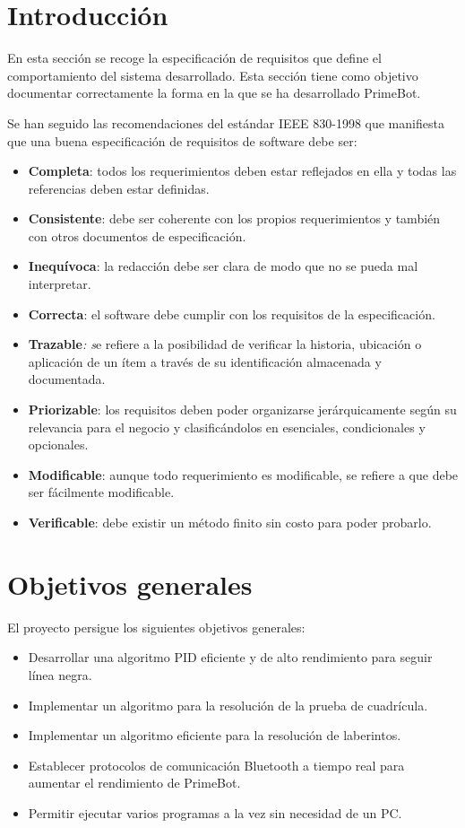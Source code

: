 
\section{Introducción}

En esta sección se recoge la especificación de requisitos que define el comportamiento del sistema desarrollado.
Esta sección tiene como objetivo documentar correctamente la forma en la que se ha desarrollado PrimeBot.

Se han seguido las recomendaciones del estándar IEEE 830-1998 que manifiesta que una buena especificación de requisitos de software debe ser:

\begin{itemize}
\tightlist
\item
  \textbf{Completa}: todos los requerimientos deben estar reflejados en
  ella y todas las referencias deben estar definidas.
\item
  \textbf{Consistente}: debe ser coherente con los propios
  requerimientos y también con otros documentos de especificación.
\item
  \textbf{Inequívoca}: la redacción debe ser clara de modo que no se
  pueda mal interpretar.
\item
  \textbf{Correcta}: el software debe cumplir con los requisitos de la
  especificación.
\item
  \textbf{Trazable}\emph{: s}e refiere a la posibilidad de verificar la
  historia, ubicación o aplicación de un ítem a través de su
  identificación almacenada y documentada.
\item
  \textbf{Priorizable}: los requisitos deben poder organizarse
  jerárquicamente según su relevancia para el negocio y clasificándolos
  en esenciales, condicionales y opcionales.
\item
  \textbf{Modificable}: aunque todo requerimiento es modificable, se
  refiere a que debe ser fácilmente modificable.
\item
  \textbf{Verificable}: debe existir un método finito sin costo para
  poder probarlo.
\end{itemize}

\section{Objetivos generales}
El proyecto persigue los siguientes objetivos generales:

\begin{itemize}
\tightlist
\item
  Desarrollar una algoritmo PID eficiente y de alto rendimiento para seguir línea negra.
\item
  Implementar un algoritmo para la resolución de la prueba de cuadrícula.
\item
  Implementar un algoritmo eficiente para la resolución de laberintos.
\item
  Establecer protocolos de comunicación Bluetooth a tiempo real para aumentar el rendimiento de PrimeBot.
  \item
  Permitir ejecutar varios programas a la vez sin necesidad de un PC.
\end{itemize}


